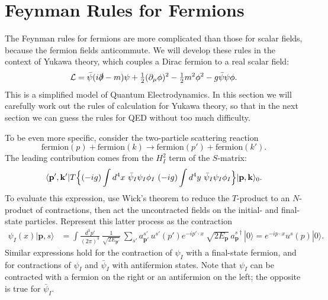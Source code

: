 \section{Feynman Rules for Fermions}

The Feynman rules for fermions are more complicated than those for scalar
fields, because the fermion fields anticommute.  We will develop these rules
in the context of Yukawa theory, which couples a Dirac fermion to a real
scalar field:
\begin{equation}
  \mathcal{L} = \bar{\psi}(i\slashed{\partial} - m)\psi
    + \tfrac{1}{2}(\partial_\mu\phi)^2 - \tfrac{1}{2}m^2\phi^2
    - g\bar{\psi}\psi\phi .
  \label{eq:4.112}
\end{equation}
This is a simplified model of Quantum Electrodynamics.  In this section we
will carefully work out the rules of calculation for Yukawa theory, so that
in the next section we can guess the rules for QED without too much
difficulty.

To be even more specific, consider the two-particle scattering reaction
\begin{equation}
  \text{fermion}(p) + \text{fermion}(k) \to \text{fermion}(p')
    + \text{fermion}(k') .
  \label{eq:4.113}
\end{equation}
The leading contribution comes from the $H_I^2$ term of the $S$-matrix:
\begin{equation}
  \langle \mathbf{p}',\mathbf{k}'|T\Bigl\{ (-ig)\int d^4x\
    \bar{\psi}_I\psi_I\phi_I\ (-ig)\int d^4y\
    \bar{\psi}_I\psi_I\phi_I \Bigr\}|\mathbf{p},\mathbf{k}\rangle_0 .
  \label{eq:4.114}
\end{equation}
To evaluate this expression, use Wick's theorem to reduce the $T$-product to
an $N$-product of contractions, then act the uncontracted fields on the
initial- and final-state particles.  Represent this latter process as the
contraction
\begin{equation}
  \begin{aligned}
    \psi_I(x)|\mathbf{p}, s\rangle &=
      \int \frac{d^3p'}{(2\pi)^3}\ \frac{1}{\sqrt{2E_{\mathbf{p}'}}}\
        \sum_{s'} a_{\mathbf{p}'}^{s'}\,u^{s'}(p')e^{-ip'\cdot x}\
      \sqrt{2E_{\mathbf{p}}}\,a_{\mathbf{p}}^{s\dagger}|0\rangle
    = e^{-ip\cdot x}u^s(p)|0\rangle .
  \end{aligned}
  \label{eq:4.115}
\end{equation}
Similar expressions hold for the contraction of $\psi_I$ with a final-state
fermion, and for contractions of $\psi_I$ and $\bar{\psi}_I$ with
antifermion states.  Note that $\psi_I$ can be contracted with a fermion on
the right or an antifermion on the left; the opposite is true for
$\bar{\psi}_I$.

